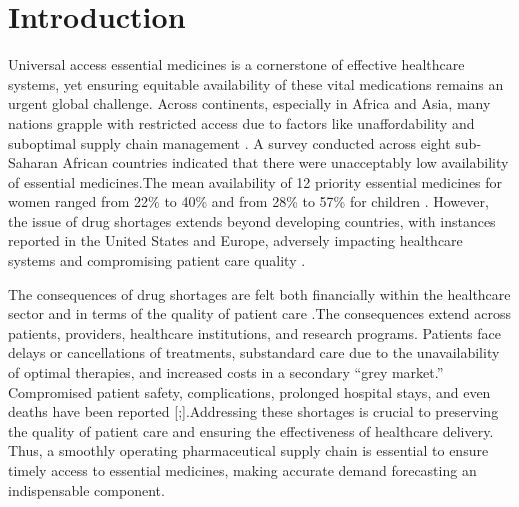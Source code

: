 \documentclass[
  authoryear,
  preprint,
  3p]{elsarticle}
\begin{document}
\hypertarget{sec-intro}{%
\section{Introduction}\label{sec-intro}}

Universal access essential medicines is a cornerstone of effective
healthcare systems, yet ensuring equitable availability of these vital
medications remains an urgent global
challenge\citep{quick2003essential, world2004annual}. Across continents,
especially in Africa and Asia, many nations grapple with restricted
access due to factors like unaffordability and suboptimal supply chain
management \citep{world2004medicines}. A survey conducted across eight
sub-Saharan African countries indicated that there were unacceptably low
availability of essential medicines.The mean availability of 12 priority
essential medicines for women ranged from 22\% to 40\% and from 28\% to
57\% for children \citep{droti2019poor}. However, the issue of drug
shortages extends beyond developing countries, with instances reported
in the United States and Europe, adversely impacting healthcare systems
and compromising patient care quality
\citetext{\citealp[\citet{kaakeh2011impact}]{fox2003managing}; \citealp{johnson2011drug}; \citealp{huys2013european}; \citealp{le2011prevalence}}.

The consequences of drug shortages are felt both financially within the
healthcare sector and in terms of the quality of patient care
\citep{alspach2012drug, kaakeh2011impact, kaakeh2011impact, baumer2004national}.The
consequences extend across patients, providers, healthcare institutions,
and research programs. Patients face delays or cancellations of
treatments, substandard care due to the unavailability of optimal
therapies, and increased costs in a secondary ``grey market.''
Compromised patient safety, complications, prolonged hospital stays, and
even deaths have been reported {[}\citet{alspach2012drug};{]}.Addressing
these shortages is crucial to preserving the quality of patient care and
ensuring the effectiveness of healthcare delivery. Thus, a smoothly
operating pharmaceutical supply chain is essential to ensure timely
access to essential medicines, making accurate demand forecasting an
indispensable component.
\end{document}
